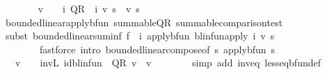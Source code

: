 \begin{isabellebody}
\ \ \ \ \isamarkupfalse%
\ {\isachardoublequoteopen}{}\ {\isasymle}\ v\ {\isasymLongrightarrow}\ {}\ {\isasymle}\ {\isacharparenleft}{\kern0pt}{\isasymSum}i{\isachardot}{\kern0pt}\ {\isacharparenleft}{\kern0pt}{\isacharparenleft}{\kern0pt}{\isacharquery}{\kern0pt}QR\ {\isacharcircum}{\kern0pt}{\isacharcircum}{\kern0pt}\ i{\isacharparenright}{\kern0pt}{\isacharparenright}{\kern0pt}{\isacharparenright}{\kern0pt}\ v\ s{\isachardoublequoteclose}\ \ v\ s\isanewline
\ \ \ \ \ \ \isamarkupfalse%
\ bounded{\isacharunderscore}{\kern0pt}linear{\isacharunderscore}{\kern0pt}apply{\isacharunderscore}{\kern0pt}bfun\ summable{\isacharunderscore}{\kern0pt}QR\ summable{\isacharunderscore}{\kern0pt}comparison{\isacharunderscore}{\kern0pt}test{\isacharprime}{\kern0pt}\ \isanewline
\ \ \ \ \ \ \isamarkupfalse%
\ {\isacharparenleft}{\kern0pt}subst\ bounded{\isacharunderscore}{\kern0pt}linear{\isachardot}{\kern0pt}suminf{\isacharbrackleft}{\kern0pt}\ f\ {\isacharequal}{\kern0pt}\ {\isachardoublequoteopen}{\isacharparenleft}{\kern0pt}{\isasymlambda}i{\isachardot}{\kern0pt}\ apply{\isacharunderscore}{\kern0pt}bfun\ {\isacharparenleft}{\kern0pt}blinfun{\isacharunderscore}{\kern0pt}apply\ i\ v{\isacharparenright}{\kern0pt}\ s{\isacharparenright}{\kern0pt}{\isachardoublequoteclose}{\isacharbrackright}{\kern0pt}{\isacharparenright}{\kern0pt}\isanewline
\ \ \ \ \ \ \ \ {\isacharparenleft}{\kern0pt}fastforce\ intro{\isacharcolon}{\kern0pt}\ bounded{\isacharunderscore}{\kern0pt}linear{\isacharunderscore}{\kern0pt}compose{\isacharbrackleft}{\kern0pt}of\ {\isachardoublequoteopen}{\isasymlambda}s{\isachardot}{\kern0pt}\ apply{\isacharunderscore}{\kern0pt}bfun\ s\ {\isacharunderscore}{\kern0pt}{\isachardoublequoteclose}{\isacharbrackright}{\kern0pt}{\isacharparenright}{\kern0pt}{\isacharplus}{\kern0pt}\isanewline
\ \ \ \ \isamarkupfalse%
\ {\isachardoublequoteopen}{}\ {\isasymle}\ v\ {\isasymLongrightarrow}\ {}\ {\isasymle}\ inv\isactrlsub L\ {\isacharparenleft}{\kern0pt}id{\isacharunderscore}{\kern0pt}blinfun\ {\isacharminus}{\kern0pt}\ {\isacharquery}{\kern0pt}QR{\isacharparenright}{\kern0pt}\ v{\isachardoublequoteclose}\ \ v\isanewline
\ \ \ \ \ \ \isamarkupfalse%
\ {\isacharparenleft}{\kern0pt}simp\ add{\isacharcolon}{\kern0pt}\ inv{\isacharunderscore}{\kern0pt}eq\ less{\isacharunderscore}{\kern0pt}eq{\isacharunderscore}{\kern0pt}bfun{\isacharunderscore}{\kern0pt}def{\isacharparenright}{\kern0pt}\isanewline

\end{isabellebody}
